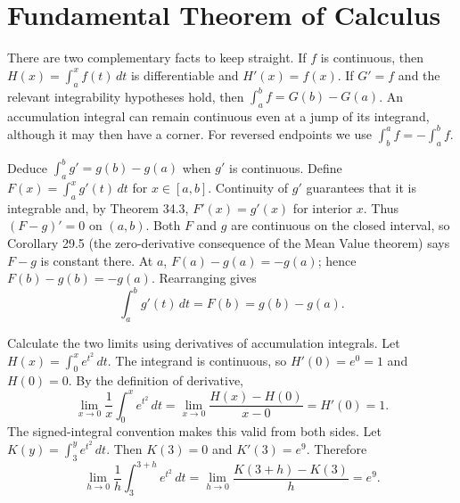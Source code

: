 \section{Fundamental Theorem of Calculus}
There are two complementary facts to keep straight. If $f$ is continuous,
then $H(x)=\int_a^x f(t)\,dt$ is differentiable and $H'(x)=f(x)$.
If $G'=f$ and the relevant integrability hypotheses hold, then
$\int_a^b f=G(b)-G(a)$. An accumulation integral can remain continuous
even at a jump of its integrand, although it may then have a corner.
For reversed endpoints we use $\int_b^a f=-\int_a^b f$.

\goal Deduce $\int_a^b g'=g(b)-g(a)$ when $g'$ is continuous.
Define $F(x)=\int_a^x g'(t)\,dt$ for $x\in[a,b]$.
Continuity of $g'$ guarantees that it is integrable and, by Theorem 34.3,
$F'(x)=g'(x)$ for interior $x$. Thus $(F-g)'=0$ on $(a,b)$.
Both $F$ and $g$ are continuous on the closed interval, so Corollary 29.5
(the zero-derivative consequence of the Mean Value theorem) says $F-g$
is constant there. At $a$, $F(a)-g(a)=-g(a)$; hence
$F(b)-g(b)=-g(a)$. Rearranging gives
\[
 \int_a^b g'(t)\,dt=F(b)=g(b)-g(a).
\]

\goal Calculate the two limits using derivatives of accumulation integrals.
Let $H(x)=\int_0^x e^{t^2}\,dt$. The integrand is continuous, so
$H'(0)=e^0=1$ and $H(0)=0$. By the definition of derivative,
\[
 \lim_{x\to0}\frac1x\int_0^x e^{t^2}\,dt
 =\lim_{x\to0}\frac{H(x)-H(0)}{x-0}=H'(0)=1.
\]
The signed-integral convention makes this valid from both sides.
Let $K(y)=\int_3^y e^{t^2}\,dt$. Then $K(3)=0$ and
$K'(3)=e^9$. Therefore
\[
 \lim_{h\to0}\frac1h\int_3^{3+h}e^{t^2}\,dt
 =\lim_{h\to0}\frac{K(3+h)-K(3)}h=e^9.
\]

